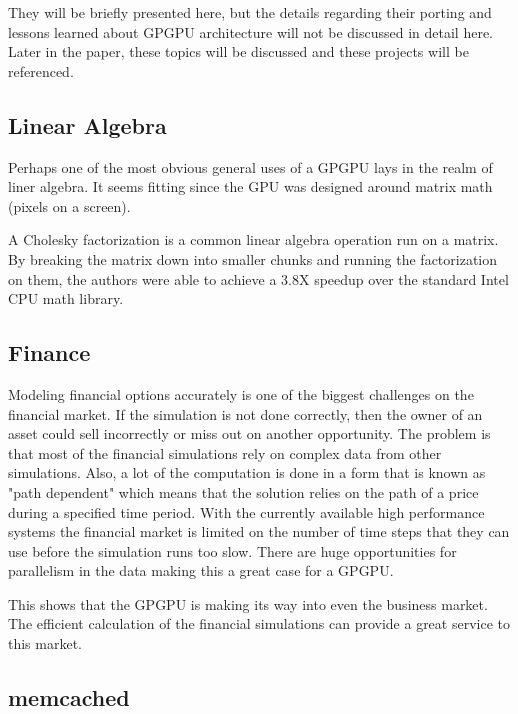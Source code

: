 They will be briefly presented here, but the details regarding their porting and lessons learned about GPGPU architecture will not be discussed in detail here. Later in the paper, these topics will be discussed and these projects will be referenced. 

\subsection*{Linear Algebra}

Perhaps one of the most obvious general uses of a GPGPU lays in the realm of liner algebra. It seems fitting since the GPU was designed around matrix math (pixels on a screen). 

A Cholesky factorization is a common linear algebra operation run on a matrix. By breaking the matrix down into smaller chunks and running the factorization on them, the authors were able to achieve a 3.8X speedup over the standard Intel CPU math library. \cite{linearalg}

\subsection*{Finance}

Modeling financial options accurately is one of the biggest challenges on the financial market. If the simulation is not done correctly, then the owner of an asset could sell incorrectly or miss out on another opportunity. The problem is that most of the financial simulations rely on complex data from other simulations. Also, a lot of the computation is done in a form that is known as "path dependent" which means that the solution relies on the path of a price during a specified time period. \cite{finance} With the currently available high performance systems the financial market is limited on the number of time steps that they can use before the simulation runs too slow. There are huge opportunities for parallelism in the data making this a great case for a GPGPU. 

This shows that the GPGPU is making its way into even the business market. The efficient calculation of the financial simulations can provide a great service to this market. \cite{finance}

\subsection*{memcached}


